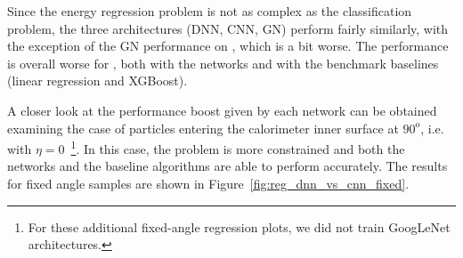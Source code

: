 Since the energy regression problem is not as complex as the classification problem, the three architectures (DNN, CNN, GN) perform fairly similarly, with the exception of the GN performance on \chpi, which is a bit worse. The performance is overall worse for \chpi, both with the networks and with the benchmark baselines (linear regression and XGBoost).

A closer look at the performance boost given by each network can be obtained examining the case of particles entering the calorimeter inner surface at $90^{\mathrm o}$, i.e. with $\eta=0$~\footnote{For these additional fixed-angle regression plots, we did not train GoogLeNet architectures.}. In this case, the problem is more constrained and both the networks and the baseline algorithms are able to perform accurately. The results for fixed angle samples are shown in Figure~\ref{fig:reg_dnn_vs_cnn_fixed}.

